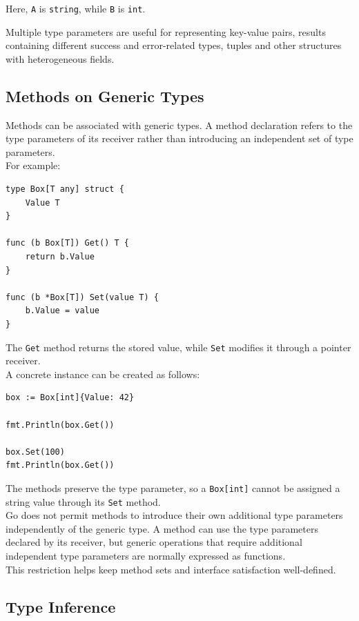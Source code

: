 Here, \texttt{A} is \texttt{string}, while \texttt{B} is \texttt{int}.

Multiple type parameters are useful for representing key-value pairs, results containing different success and error-related types, tuples and other structures with heterogeneous fields.

\subsection{Methods on Generic Types}

Methods can be associated with generic types. A method declaration refers to the type parameters of its receiver rather than introducing an independent set of type parameters.\\

For example:

\begin{lstlisting}
type Box[T any] struct {
    Value T
}

func (b Box[T]) Get() T {
    return b.Value
}

func (b *Box[T]) Set(value T) {
    b.Value = value
}
\end{lstlisting}

The \texttt{Get} method returns the stored value, while \texttt{Set} modifies it through a pointer receiver.\\

A concrete instance can be created as follows:

\begin{lstlisting}
box := Box[int]{Value: 42}

fmt.Println(box.Get())

box.Set(100)
fmt.Println(box.Get())
\end{lstlisting}

The methods preserve the type parameter, so a \texttt{Box[int]} cannot be assigned a string value through its \texttt{Set} method.\\

Go does not permit methods to introduce their own additional type parameters independently of the generic type. A method can use the type parameters declared by its receiver, but generic operations that require additional independent type parameters are normally expressed as functions.\\

This restriction helps keep method sets and interface satisfaction well-defined.

\subsection{Type Inference}


